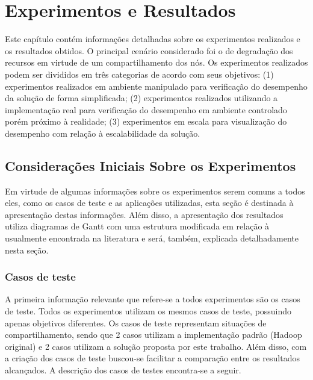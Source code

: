 \chapter{Experimentos e Resultados}
\label{chap:ExpRes}
Este capítulo contém informações detalhadas sobre os experimentos realizados e os resultados obtidos. O principal cenário considerado foi o de degradação dos recursos em virtude de um compartilhamento dos nós. Os experimentos realizados podem ser divididos em três categorias de acordo com seus objetivos: (1) experimentos realizados em ambiente manipulado para verificação do desempenho da solução de forma simplificada; (2) experimentos realizados utilizando a implementação real para verificação do desempenho em ambiente controlado porém próximo à realidade; (3) experimentos em escala para visualização do desempenho com relação à escalabilidade da solução.

\section{Considerações Iniciais Sobre os Experimentos}
Em virtude de algumas informações sobre os experimentos serem comuns a todos eles, como os casos de teste e as aplicações utilizadas, esta seção é destinada à apresentação destas informações. Além disso, a apresentação dos resultados utiliza diagramas de Gantt com uma estrutura modificada em relação à usualmente encontrada na literatura e será, também, explicada detalhadamente nesta seção.

\subsection{Casos de teste}
\label{sec:casosteste}
A primeira informação relevante que refere-se a todos experimentos são os casos de teste. Todos os experimentos utilizam os mesmos casos de teste, possuindo apenas objetivos diferentes. Os casos de teste representam situações de compartilhamento, sendo que 2 casos utilizam a implementação padrão (Hadoop original) e 2 casos utilizam a solução proposta por este trabalho. Além disso, com a criação dos casos de teste buscou-se facilitar a comparação entre os resultados alcançados. A descrição dos casos de testes encontra-se a seguir.

